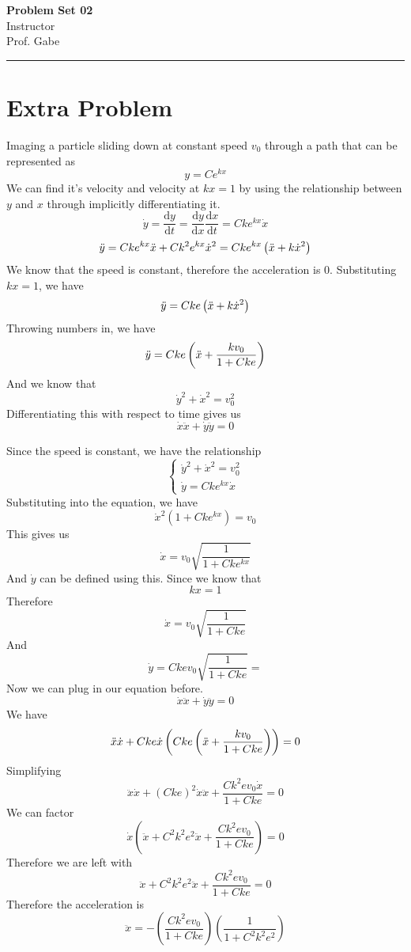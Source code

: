 \documentclass[12pt]{article}
\newcommand{\dydx}[2]{\frac{\text{d} #1}{\text{d} #2}}
\newcommand{\paren}[1]{\left( #1 \right)}
\newif\ifshow
\begin{document}
\begin{center}
\ifshow
  \textbf{\Large Problem Set 02 Solution}\\
\else
  \textbf{\Large Problem Set 02}\\
\fi
Instructor \\ Prof. Gabe\\
\end{center}

\hrule

\vspace{0.2cm}
\section{Extra Problem}
Imaging a particle sliding down at constant speed $v_0$ through a path that can be represented as
\[
y = Ce^{kx}
\]
We can find it's velocity and velocity at $kx=1$ by using the relationship between $y$ and $x$ through implicitly differentiating it.
\[
\dot{y} = \dydx{y}{t} = \dydx{y}{x}\dydx{x}{t} = Cke^{kx}\dot{x}
\]
\[
\Ddot{y} = Cke^{kx}\Ddot{x} + Ck^2e^{kx}\dot{x}^2 = Cke^{kx}\paren{\Ddot{x} + k\dot{x}^2}
\]
We know that the speed is constant, therefore the acceleration is $0$. Substituting $kx=1$, we have
\[
\Ddot{y} = Cke\paren{\Ddot{x} + k\dot{x}^2}
\]
Throwing numbers in, we have
\[
\Ddot{y} = Cke\paren{\Ddot{x} + \frac{kv_0}{1+Cke}}
\]
And we know that
\[
\dot{y}^2 + \dot{x}^2 = v_0^2
\]
Differentiating this with respect to time gives us
\[
\dot{x}\ddot{x}+\dot{y}\ddot{y} = 0
\]

Since the speed is constant, we have the relationship
\[
\begin{cases}
    \dot{y}^2 + \dot{x}^2 = v_0^2\\
    \dot{y} = Cke^{kx}\dot{x}
\end{cases}
\]
Substituting into the equation, we have
\[
\dot{x}^2\paren{1 + Cke^{kx}} = v_0
\]
This gives us
\[
\dot{x} = v_0\sqrt{\frac{1}{1+Cke^{kx}}}
\]
And $\dot{y}$ can be defined using this. Since we know that
\[
kx = 1
\]
Therefore
\[
\dot{x} = v_0\sqrt{\frac{1}{1+Cke}}
\]
And 
\[
\dot{y} = Ckev_0\sqrt{\frac{1}{1+Cke}} = 
\]
Now we can plug in our equation before.
\[
\dot{x}\ddot{x}+\dot{y}\ddot{y} = 0
\]
We have
\[
\ddot{x}\dot{x} + Cke\dot{x}\paren{ Cke\paren{\Ddot{x} + \frac{kv_0}{1+Cke}}} = 0
\]
Simplifying
\[
\ddot{x}\dot{x} + \paren{Cke}^2\dot{x}\ddot{x} + \frac{Ck^2ev_0\dot{x}}{1+Cke} = 0
\]
We can factor
\[
\dot{x}\paren{\ddot{x}+C^2k^2e^2\ddot{x} + \frac{Ck^2ev_0}{1+Cke}} = 0
\]
Therefore we are left with
\[
\ddot{x}+C^2k^2e^2\ddot{x} + \frac{Ck^2ev_0}{1+Cke} = 0
\]
Therefore the acceleration is
\[
\ddot{x} = -\paren{\frac{Ck^2ev_0}{1+Cke}}\paren{\frac{1}{1+C^2k^2e^2}}
\]
\end{document}
